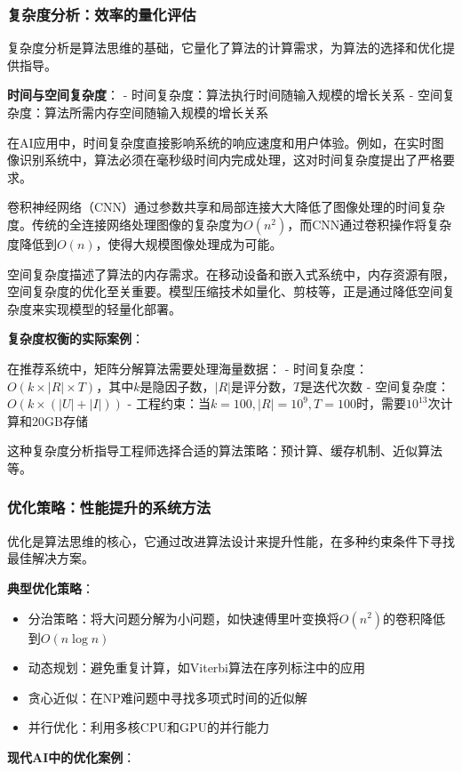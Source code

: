 \subsubsection{复杂度分析：效率的量化评估}

复杂度分析是算法思维的基础，它量化了算法的计算需求，为算法的选择和优化提供指导。

\textbf{时间与空间复杂度}：
- 时间复杂度：算法执行时间随输入规模的增长关系
- 空间复杂度：算法所需内存空间随输入规模的增长关系

在AI应用中，时间复杂度直接影响系统的响应速度和用户体验。例如，在实时图像识别系统中，算法必须在毫秒级时间内完成处理，这对时间复杂度提出了严格要求。

卷积神经网络（CNN）通过参数共享和局部连接大大降低了图像处理的时间复杂度。传统的全连接网络处理图像的复杂度为$O(n^2)$，而CNN通过卷积操作将复杂度降低到$O(n)$，使得大规模图像处理成为可能。

空间复杂度描述了算法的内存需求。在移动设备和嵌入式系统中，内存资源有限，空间复杂度的优化至关重要。模型压缩技术如量化、剪枝等，正是通过降低空间复杂度来实现模型的轻量化部署。

\textbf{复杂度权衡的实际案例}：

在推荐系统中，矩阵分解算法需要处理海量数据：
- 时间复杂度：$O(k \times |R| \times T)$，其中$k$是隐因子数，$|R|$是评分数，$T$是迭代次数
- 空间复杂度：$O(k \times (|U| + |I|))$
- 工程约束：当$k=100, |R|=10^9, T=100$时，需要$10^{13}$次计算和20GB存储

这种复杂度分析指导工程师选择合适的算法策略：预计算、缓存机制、近似算法等。

\subsubsection{优化策略：性能提升的系统方法}

优化是算法思维的核心，它通过改进算法设计来提升性能，在多种约束条件下寻找最佳解决方案。

\textbf{典型优化策略}：
\begin{itemize}
\item 分治策略：将大问题分解为小问题，如快速傅里叶变换将$O(n^2)$的卷积降低到$O(n \log n)$
\item 动态规划：避免重复计算，如Viterbi算法在序列标注中的应用
\item 贪心近似：在NP难问题中寻找多项式时间的近似解
\item 并行优化：利用多核CPU和GPU的并行能力
\end{itemize}

\textbf{现代AI中的优化案例}：

